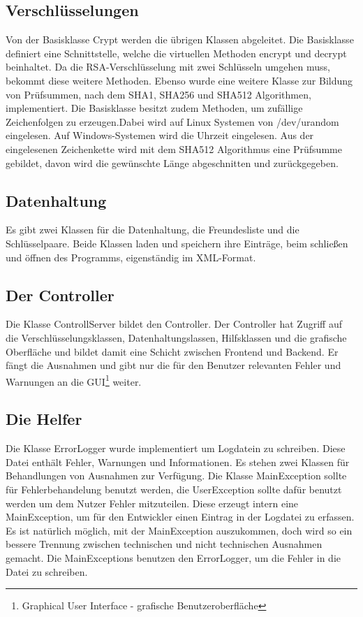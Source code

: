 \documentclass[12pt,a4paper,titlepage]{article}
\begin{document}
\subsection{Verschlüsselungen}
Von der Basisklasse Crypt werden die übrigen Klassen abgeleitet. Die Basisklasse definiert eine Schnittstelle, welche die virtuellen Methoden encrypt und decrypt beinhaltet. Da die RSA-Verschlüsselung mit zwei Schlüsseln umgehen muss, bekommt diese weitere Methoden. Ebenso wurde eine weitere Klasse zur Bildung von Prüfsummen, nach dem SHA1, SHA256 und SHA512 Algorithmen, implementiert.
Die Basisklasse besitzt zudem Methoden, um zufällige Zeichenfolgen zu erzeugen.Dabei wird auf Linux Systemen von /dev/urandom eingelesen. Auf Windows-Systemen wird die Uhrzeit eingelesen. Aus der eingelesenen Zeichenkette wird mit dem SHA512 Algorithmus eine Prüfsumme gebildet, davon wird die gewünschte Länge abgeschnitten und zurückgegeben.
\subsection{Datenhaltung}
Es gibt zwei Klassen für die Datenhaltung, die Freundesliste und die Schlüsselpaare. Beide Klassen laden und speichern ihre Einträge, beim schließen und öffnen des Programms, eigenständig im XML-Format.
\subsection{Der Controller}
Die Klasse ControllServer bildet den Controller. Der Controller hat Zugriff auf die Verschlüsselungsklassen, Datenhaltungslassen, Hilfsklassen und die grafische Oberfläche und bildet damit eine Schicht zwischen Frontend und Backend. Er fängt die Ausnahmen und gibt nur die für den Benutzer relevanten Fehler und Warnungen an die GUI\footnote{Graphical User Interface - grafische Benutzeroberfläche} weiter.
\subsection{Die Helfer}
Die Klasse ErrorLogger wurde implementiert um Logdatein zu schreiben. Diese Datei enthält Fehler, Warnungen und Informationen. Es stehen zwei Klassen für Behandlungen von Ausnahmen zur Verfügung. Die Klasse MainException sollte für Fehlerbehandelung benutzt werden, die UserException sollte dafür benutzt werden um dem Nutzer Fehler mitzuteilen. Diese erzeugt intern eine MainException, um für den Entwickler einen Eintrag in der Logdatei zu erfassen. Es ist natürlich möglich, mit der MainException auszukommen, doch wird so ein bessere Trennung zwischen technischen und nicht technischen Ausnahmen gemacht. Die MainExceptions benutzen den ErrorLogger, um die Fehler in die Datei zu schreiben.
\newpage
\end{document}
